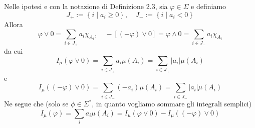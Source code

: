 \begin{oss}[$a$]\label{oss: 2.4a}
    Nelle ipotesi e con la notazione di Definizione 2.3, sia $\varphi \in \Sigma$ e definiamo
    \[
    J_{+}:=\left\{i \mid a_{i} \geq 0\right\}, \quad J_{-}:=\left\{i \mid a_{i}<0\right\}
    \]
    Allora
    \[
    \varphi \vee 0=\sum_{i \in J_{+}} a_{i} \chi_{A_{i}}, \quad-[(-\varphi) \vee 0]=\varphi \wedge 0=\sum_{i \in J_{-}} a_{i} \chi_{A_{i}}
    \]
    da cui
    \[
    I_{\mu}(\varphi \vee 0)=\sum_{i \in J_{+}} a_{i} \mu\left(A_{i}\right)=\sum_{i \in J_{+}}\left|a_{i}\right| \mu\left(A_{i}\right)
    \]
    e
    \[
    I_{\mu}((-\varphi) \vee 0)=\sum_{i \in J_{-}}\left(-a_{i}\right) \mu\left(A_{i}\right)=\sum_{i \in J_{-}}\left|a_{i}\right| \mu\left(A_{i}\right)
    \]
    Ne segue che (solo se $\phi\in \Sigma^*$, in quanto vogliamo sommare gli integrali semplici)
    \[
    I_{\mu}(\varphi)=\sum_{i} a_{i} \mu\left(A_{i}\right)=I_{\mu}(\varphi \vee 0)-I_{\mu}((-\varphi) \vee 0)
    \]
\end{oss}
\addtocounter{xoss}{-1}
